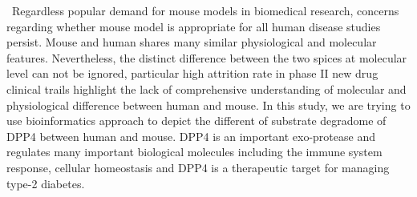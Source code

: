 \ 
Regardless popular demand for mouse models in biomedical research, concerns regarding whether mouse model is appropriate for all human disease studies persist. Mouse and human shares many similar physiological and molecular features. Nevertheless, the distinct difference between the two spices at molecular level can not be ignored, particular high attrition rate in phase II new drug clinical trails highlight the lack of comprehensive understanding of molecular and physiological difference between human and mouse. In this study, we are trying to use bioinformatics approach to depict the different of substrate degradome of DPP4 between human and mouse. DPP4 is an important exo-protease and regulates many important biological molecules including the immune system response, cellular homeostasis and DPP4 is a therapeutic target for managing type-2 diabetes. 
